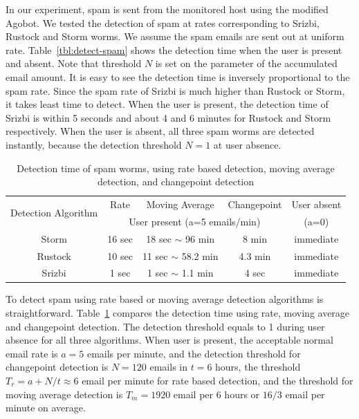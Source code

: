 In our experiment, spam is sent from the monitored host using the
modified Agobot.
We tested the detection of spam at rates corresponding to Srizbi,
Rustock and Storm worms.
We assume the spam emails are sent out at uniform rate.
Table~\ref{tbl:detect-spam} shows the
detection time when the user is present and absent.
Note that threshold $N$ is set on the parameter of the accumulated
email amount. It is easy to see the detection time is inversely
proportional to the spam rate. Since the spam rate of Srizbi is much
higher than Rustock or Storm, it takes least time to detect. When
the user is present, the detection time of Srizbi is within 5 seconds
and about 4 and 6 minutes for Rustock and Storm respectively.
When the user is absent, all three spam worms are detected
instantly, because the detection threshold $N=1$ at user absence.

\begin{table}[!t]
  \centering
  \begin{tabular}{|c|c|c|c|c|}
  \hline
  \multirow{2}{*}{Detection Algorithm} & Rate & Moving Average & Changepoint & User absent \\ \cline{2-4}
  & \multicolumn{3}{|c|}{User present (a=5 emails/min)}  & (a=0)\\ \hline
  \hline
  Storm   & 16 sec & 18 sec $\sim$ 96 min & 8 min & immediate\\
  \hline
  Rustock & 10 sec & 11 sec $\sim$ 58.2 min & 4.3 min & immediate\\
  \hline
  Srizbi  &  1 sec &  1 sec $\sim$ 1.1 min & 4 sec & immediate\\ [0.5ex]
  \hline
  \end{tabular}
  \caption{Detection time of spam worms, using rate based detection, moving average detection, and changepoint detection} 
  \label{tbl:detect-spam2}
\end{table}

To detect spam using rate based or moving average detection algorithms
is straightforward. 
Table~\ref{tbl:detect-spam2} compares the detection time using rate,
moving average and changepoint detection.
The detection threshold equals to 1 during user absence for all three algorithms.
When user is present, the acceptable normal email rate is
$a=5$ emails per minute,
and the detection threshold for changepoint detection is $N=120$
emails in $t=6$ hours,
the threshold $T_r=a+N/t\approx6$ email per minute for rate based detection,
and the threshold for moving average detection is $T_m = 1920$ email
per 6 hours or $16/3$ email per minute on average.

